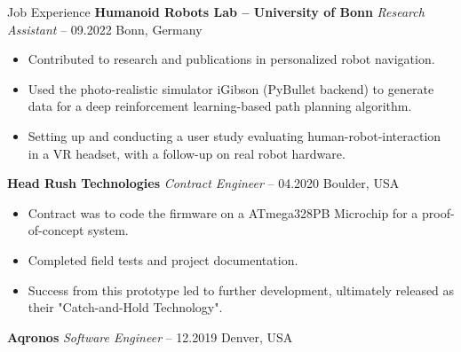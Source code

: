\begin{rubric}{Job Experience}
%
%
\entry*[] \textbf{Humanoid Robots Lab -- University of Bonn} \hfill \textit{Research Assistant}  -- 09.2022 \hfill Bonn, Germany \newline 
\vspace{\CVItemizeHeaderSpacing} \begin{itemize} %
	\setlength{\itemsep}{\CVItemizeSpacing}
	\item Contributed to research and publications in personalized robot navigation.
	\item Used the photo-realistic simulator iGibson (PyBullet backend) to generate data for a deep reinforcement learning-based path planning algorithm. 
	\item Setting up and conducting a user study evaluating human-robot-interaction in a VR headset, with a follow-up on real robot hardware.
\end{itemize}
%
%
\entry*[] \textbf{Head Rush Technologies} \hfill \textit{Contract Engineer}  -- 04.2020 \hfill Boulder, USA \newline 
\vspace{\CVItemizeHeaderSpacing} \begin{itemize} %
	\setlength{\itemsep}{\CVItemizeSpacing}
	\item Contract was to code the firmware on a ATmega328PB Microchip for a proof-of-concept system.  
	\item Completed field tests and project documentation.  
	\item Success from this prototype led to further development, ultimately released as their "Catch-and-Hold Technology".
\end{itemize}
%
%
\entry*[] \textbf{Aqronos} \hfill \textit{Software Engineer}  -- 12.2019 \hfill Denver, USA \newline
\vspace{\CVItemizeHeaderSpacing} \begin{itemize} %

\end{itemize}
\end{rubric}
